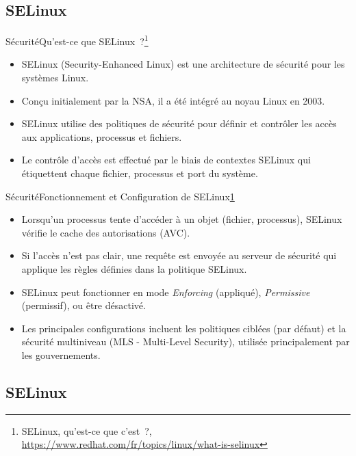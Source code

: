 \documentclass{beamer}
\begin{document}
    \subsection{SELinux}\label{subsec:selinux}

    \begin{frame}{Sécurité}{Qu'est-ce que SELinux~?\footnote{\label{selinux-redhat}SELinux, qu'est-ce que c'est~?, \url{https://www.redhat.com/fr/topics/linux/what-is-selinux}}}
        \begin{itemize}
            \item SELinux (Security-Enhanced Linux) est une architecture de sécurité pour les systèmes Linux.
            \item Conçu initialement par la NSA, il a été intégré au noyau Linux en 2003.
            \item SELinux utilise des politiques de sécurité pour définir et contrôler les accès aux applications, processus et fichiers.
            \item Le contrôle d'accès est effectué par le biais de contextes SELinux qui étiquettent chaque fichier, processus et port du système.
        \end{itemize}
    \end{frame}

    \begin{frame}{Sécurité}{Fonctionnement et Configuration de SELinux\cref{selinux-redhat}}
        \begin{itemize}
            \item Lorsqu'un processus tente d'accéder à un objet (fichier, processus), SELinux vérifie le cache des autorisations (AVC).
            \item Si l'accès n'est pas clair, une requête est envoyée au serveur de sécurité qui applique les règles définies dans la politique SELinux.
            \item SELinux peut fonctionner en mode \textit{Enforcing} (appliqué), \textit{Permissive} (permissif), ou être désactivé.
            \item Les principales configurations incluent les politiques ciblées (par défaut) et la sécurité multiniveau (MLS - Multi-Level Security), utilisée principalement par les gouvernements.
        \end{itemize}
    \end{frame}

    \subsection{SELinux}\label{subsec:selinux}
\end{document}

